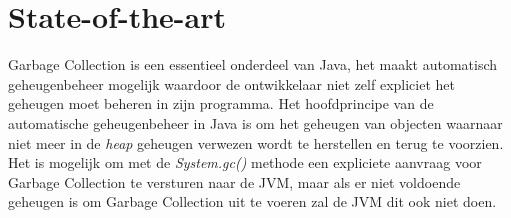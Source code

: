 






\section{State-of-the-art}%
\label{sec:state-of-the-art}

Garbage Collection is een essentieel onderdeel van Java, het maakt automatisch geheugenbeheer mogelijk waardoor de ontwikkelaar niet zelf expliciet het geheugen moet beheren in zijn programma.
Het hoofdprincipe van de automatische geheugenbeheer in Java is om het geheugen van objecten waarnaar niet meer in de \textit{heap} geheugen verwezen wordt te herstellen en terug te voorzien.
Het is mogelijk om met de \textit{System.gc()} methode een expliciete aanvraag voor Garbage Collection te versturen naar de JVM, maar als er niet voldoende geheugen is om Garbage Collection uit te voeren zal de JVM dit ook niet doen.


